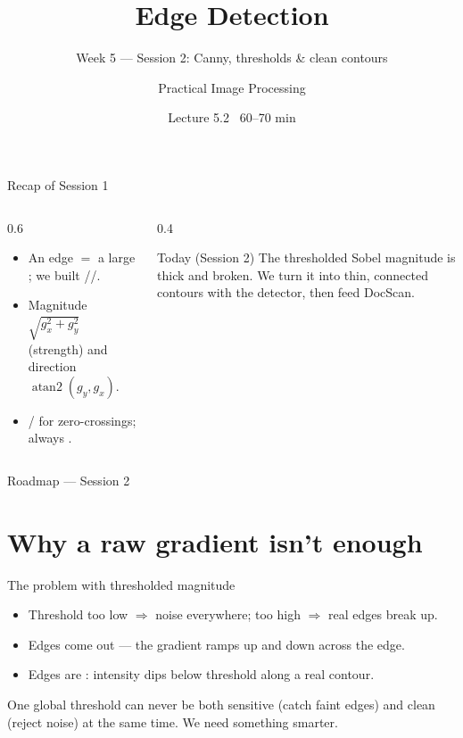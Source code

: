 \documentclass[10pt,aspectratio=169]{beamer}
\title{Edge Detection}
\subtitle{Week 5 — Session 2: Canny, thresholds \& clean contours}
\author{Practical Image Processing}
\date{Lecture 5.2 \textbullet\ 60--70 min}
\begin{document}
\maketitle

\begin{frame}{Recap of Session 1}
  \begin{columns}[T]
    \begin{column}{0.6\textwidth}
      \begin{itemize}
        \item An edge $=$ a large ; we built //.
        \item Magnitude $\sqrt{g_x^2+g_y^2}$ (strength) and direction $\operatorname{atan2}(g_y,g_x)$.
        \item {}/ for zero-crossings; always .
      \end{itemize}
    \end{column}
    \begin{column}{0.4\textwidth}
      \begin{alertblock}{Today (Session 2)}
        The thresholded Sobel magnitude is thick and broken. We turn it into thin, connected
        contours with the  detector, then feed DocScan.
      \end{alertblock}
    \end{column}
  \end{columns}
\end{frame}

\begin{frame}{Roadmap — Session 2}\tableofcontents\end{frame}

\section{Why a raw gradient isn't enough}

\begin{frame}{The problem with thresholded magnitude}
  \begin{itemize}
    \item Threshold too low $\Rightarrow$ noise everywhere; too high $\Rightarrow$ real edges break up.
    \item Edges come out  — the gradient ramps up and down across the edge.
    \item Edges are : intensity dips below threshold along a real contour.
  \end{itemize}
  \begin{badbox}
    One global threshold can never be both sensitive (catch faint edges) and clean (reject noise)
    at the same time. We need something smarter.
  \end{badbox}
\end{frame}
\end{document}
